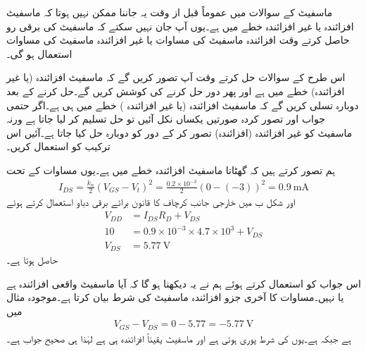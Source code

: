 ماسفیٹ کے سوالات میں عموماً قبل از وقت یہ جاننا ممکن نہیں ہوتا کہ ماسفیٹ افزائندہ یا غیر افزائندہ خطے میں ہے۔یوں آپ جان نہیں سکتے کہ ماسفیٹ کی برقی رو حاصل کرتے وقت افزائندہ ماسفیٹ کی مساوات یا غیر افزائندہ ماسفیٹ کی مساوات استعمال ہو گی۔

اس طرح کے سوالات حل کرتے وقت آپ تصور کریں گے کہ ماسفیٹ افزائندہ (یا غیر افزائندہ) خطے میں ہے اور پھر دور حل کرنے کی کوشش کریں گے۔حل کرنے کے بعد دوبارہ تسلی کریں گے کہ ماسفیٹ افزائندہ (یا غیر افزائندہ ) خطے میں ہی ہے۔اگر حتمی جواب اور تصور کردہ صورتیں یکساں نکل آئیں تو حل تسلیم کر لیا جاتا ہے ورنہ ماسفیٹ کو غیر افزائندہ (افزائندہ) تصور کر کے دور کو دوبارہ حل کیا جاتا ہے۔آئیں اس ترکیب کو استعمال کریں۔

ہم تصور کرتے ہیں کہ گھٹاتا ماسفیٹ افزائندہ خطے میں ہے۔یوں مساوات   کے تحت
\begin{align*}
I_{DS}=\frac{k_n}{2} \left(V_{GS}-V_t \right )^{2}=\frac{0.2 \times 10^{-3}}{2} \left(0-(-3) \right )^2 =\SI{0.9}{\milli \ampere}
\end{align*}
اور شکل  ب میں خارجی جانب کرچاف کا قانون برائے برقی دباو استعمال کرتے ہوئے
\begin{align*}
V_{DD}&=I_{DS} R_D+V_{DS}\\
10&=0.9 \times 10^{-3} \times 4.7 \times 10^{3}+V_{DS}\\
V_{DS}&=\SI{5.77}{\volt}
\end{align*}
حاصل ہوتا ہے۔

اس جواب کو استعمال کرتے ہوئے ہم نے یہ دیکھنا ہو گا کہ آیا ماسفیٹ واقعی افزائندہ ہے یا نہیں۔مساوات   کا آخری جزو افزائندہ ماسفیٹ کی شرط بیان کرتا ہے۔موجودہ مثال میں
\begin{align*}
V_{GS}-V_{DS}=0-5.77=\SI{-5.77}{\volt}
\end{align*}
ہے جبکہ   ہے۔یوں   کی شرط پوری ہوتی ہے اور ماسفیٹ یقیناً افزائندہ ہی ہے لہٰذا  ہی صحیح جواب ہے۔

